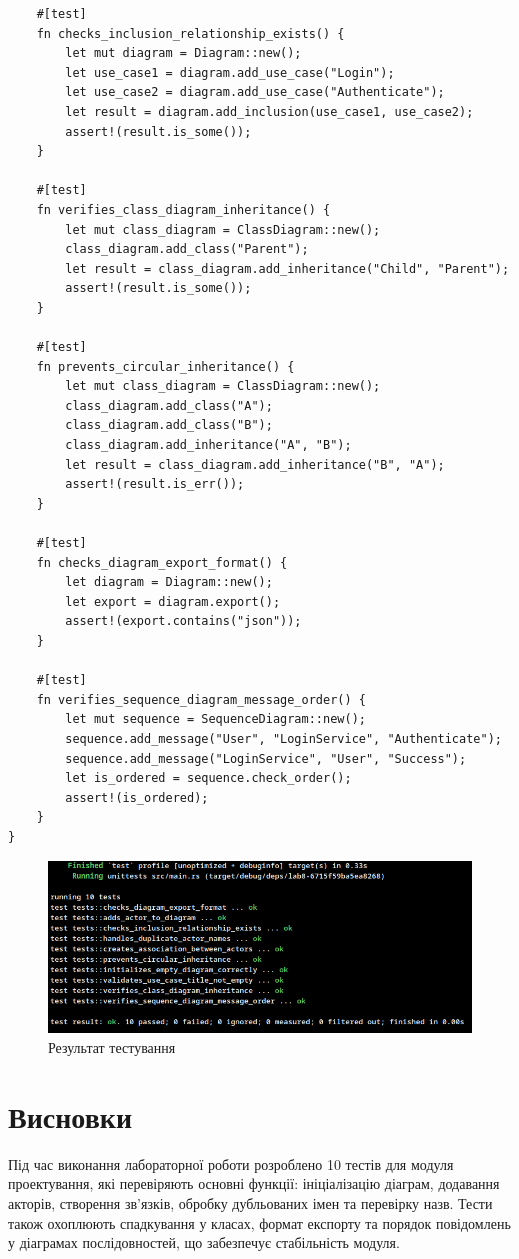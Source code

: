 \documentclass[oneside,14pt]{extarticle}
\begin{document}
\begin{normalsize}
\begin{lstlisting}
	#[test]
	fn checks_inclusion_relationship_exists() {
		let mut diagram = Diagram::new();
		let use_case1 = diagram.add_use_case("Login");
		let use_case2 = diagram.add_use_case("Authenticate");
		let result = diagram.add_inclusion(use_case1, use_case2);
		assert!(result.is_some());
	}
	
	#[test]
	fn verifies_class_diagram_inheritance() {
		let mut class_diagram = ClassDiagram::new();
		class_diagram.add_class("Parent");
		let result = class_diagram.add_inheritance("Child", "Parent");
		assert!(result.is_some());
	}
	
	#[test]
	fn prevents_circular_inheritance() {
		let mut class_diagram = ClassDiagram::new();
		class_diagram.add_class("A");
		class_diagram.add_class("B");
		class_diagram.add_inheritance("A", "B");
		let result = class_diagram.add_inheritance("B", "A");
		assert!(result.is_err());
	}
	
	#[test]
	fn checks_diagram_export_format() {
		let diagram = Diagram::new();
		let export = diagram.export();
		assert!(export.contains("json"));
	}
	
	#[test]
	fn verifies_sequence_diagram_message_order() {
		let mut sequence = SequenceDiagram::new();
		sequence.add_message("User", "LoginService", "Authenticate");
		sequence.add_message("LoginService", "User", "Success");
		let is_ordered = sequence.check_order();
		assert!(is_ordered);
	}
}
	\end{lstlisting}
	
	\begin{figure}[H]
		\centering
		\includegraphics[width=\columnwidth]{1}
		\caption{Результат тестування}
	\end{figure}
	
	\section*{Висновки}
	Під час виконання лабораторної роботи розроблено 10 тестів для модуля проектування, які перевіряють основні функції: ініціалізацію діаграм, додавання акторів, створення зв'язків, обробку дубльованих імен та перевірку назв. Тести також охоплюють спадкування у класах, формат експорту та порядок повідомлень у діаграмах послідовностей, що забезпечує стабільність модуля.
	    
\end{normalsize}
\end{document}
